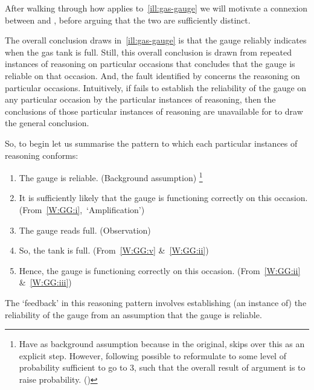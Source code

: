 \begin{note}
  After walking through how \wnf{} applies to~\autoref{ill:gas-gauge} we will motivate a connexion between \wnf{} and \nI{}, before arguing that the two are sufficiently distinct.
\end{note}

\begin{note}
  The overall conclusion  draws in~\autoref{ill:gas-gauge} is that the gauge reliably indicates when the gas tank is full.
  Still, this overall conclusion is drawn from repeated instances of reasoning on particular occasions that concludes that the gauge is reliable on that occasion.
  And, the fault identified by \wnf{} concerns the reasoning on particular occasions.
  Intuitively, if  fails to establish the reliability of the gauge on any particular occasion by the particular instances of reasoning, then the conclusions of those particular instances of reasoning are unavailable for  to draw the general conclusion.

  So, to begin let us summarise the pattern to which each particular instances of reasoning conforms:

  \begin{enumerate}
  \item\label{W:GG:i} The gauge is reliable. \hfill (Background assumption)\nolinebreak
    \footnote{
      Have as background assumption because in the original,  skips over this as an explicit step.
      However, following \citeauthor{Weisberg:2010to} possible to reformulate to some level of probability sufficient to go to 3, such that the overall result of argument is to raise probability. (\Citeyear[528]{Weisberg:2010to})
    }
  \item\label{W:GG:v} It is sufficiently likely that the gauge is functioning correctly on this occasion. \hfill \mbox{(From~\ref{W:GG:i}, `Amplification')}
  \item\label{W:GG:ii} The gauge reads full. \hfill (Observation)
  \item\label{W:GG:iii} So, the tank is full. \hfill (From~\ref{W:GG:v} \&~\ref{W:GG:ii})
  \item\label{W:GG:iv} Hence, the gauge is functioning correctly on this occasion. \hfill (From~\ref{W:GG:ii} \&~\ref{W:GG:iii})
  \end{enumerate}

  The `feedback' in this reasoning pattern involves establishing (an instance of) the reliability of the gauge from an assumption that the gauge is reliable.


\end{note}
